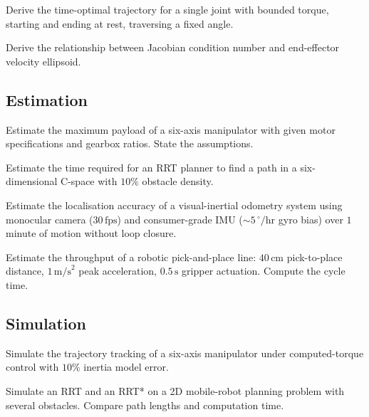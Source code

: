 \begin{exercise}
Derive the time-optimal trajectory for a single joint with bounded torque, starting and ending at rest, traversing a fixed angle.
\end{exercise}

\begin{exercise}
Derive the relationship between Jacobian condition number and end-effector velocity ellipsoid.
\end{exercise}

\subsection*{Estimation}

\begin{exercise}
Estimate the maximum payload of a six-axis manipulator with given motor specifications and gearbox ratios. State the assumptions.
\end{exercise}

\begin{exercise}
Estimate the time required for an RRT planner to find a path in a six-dimensional C-space with $10\%$ obstacle density.
\end{exercise}

\begin{exercise}
Estimate the localisation accuracy of a visual-inertial odometry system using monocular camera ($30\,\text{fps}$) and consumer-grade IMU ($\sim 5\,^\circ/\text{hr}$ gyro bias) over $1$ minute of motion without loop closure.
\end{exercise}

\begin{exercise}
Estimate the throughput of a robotic pick-and-place line: $40\,\text{cm}$ pick-to-place distance, $1\,\text{m/s}^2$ peak acceleration, $0.5\,\text{s}$ gripper actuation. Compute the cycle time.
\end{exercise}

\subsection*{Simulation}

\begin{exercise}
Simulate the trajectory tracking of a six-axis manipulator under computed-torque control with $10\%$ inertia model error.
\end{exercise}

\begin{exercise}
Simulate an RRT and an RRT* on a 2D mobile-robot planning problem with several obstacles. Compare path lengths and computation time.
\end{exercise}

